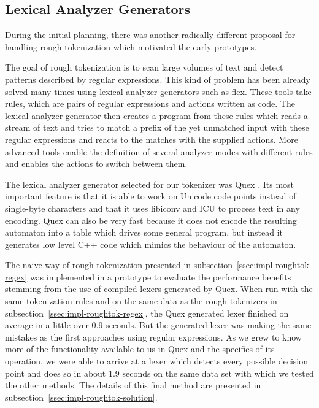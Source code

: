 \subsection{Lexical Analyzer Generators}
\label{ssec:impl-roughtok-lexergen}

During the initial planning, there was another radically different proposal for
handling rough tokenization which motivated the early prototypes.

The goal of rough tokenization is to scan large volumes of text and detect
patterns described by regular expressions. This kind of problem has been
already solved many times using lexical analyzer generators such as flex. These
tools take rules, which are pairs of regular expressions and actions written as
code. The lexical analyzer generator then creates a program from these rules
which reads a stream of text and tries to match a prefix of the yet unmatched
input with these regular expressions and reacts to the matches with the
supplied actions. More advanced tools enable the definition of several analyzer
modes with different rules and enables the actions to switch between them.

The lexical analyzer generator selected for our tokenizer was Quex
\cite{web-quex}. Its most important feature is that it is able to work on
Unicode code points instead of single-byte characters and that it uses libiconv
and ICU to process text in any encoding. Quex can also be very fast because it
does not encode the resulting automaton into a table which drives some general
program, but instead it generates low level C++ code which mimics the behaviour
of the automaton.

The naive way of rough tokenization presented in
subsection~\ref{ssec:impl-roughtok-regex} was implemented in a prototype to
evaluate the performance benefits stemming from the use of compiled lexers
generated by Quex. When run with the same tokenization rules and on the same
data as the rough tokenizers in subsection~\ref{ssec:impl-roughtok-regex}, the
Quex generated lexer finished on average in a little over 0.9 seconds. But the
generated lexer was making the same mistakes as the first approaches using
regular expressions. As we grew to know more of the functionality available to
us in Quex and the specifics of its operation, we were able to arrive at a
lexer which detects every possible decision point and does so in about 1.9
seconds on the same data set with which we tested the other methods. The
details of this final method are presented in
subsection~\ref{ssec:impl-roughtok-solution}.


